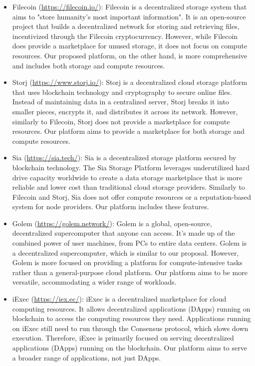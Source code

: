 \begin{itemize}
    \item Filecoin (\url{https://filecoin.io/}): Filecoin is a decentralized storage system that aims to "store humanity's most important information". It is an open-source project that builds a decentralized network for storing and retrieving files, incentivized through the Filecoin cryptocurrency. However, while Filecoin does provide a marketplace for unused storage, it does not focus on compute resources. Our proposed platform, on the other hand, is more comprehensive and includes both storage and compute resources.

    \item Storj (\url{https://www.storj.io/}): Storj is a decentralized cloud storage platform that uses blockchain technology and cryptography to secure online files. Instead of maintaining data in a centralized server, Storj breaks it into smaller pieces, encrypts it, and distributes it across its network. However, similarly to Filecoin, Storj does not provide a marketplace for compute resources. Our platform aims to provide a marketplace for both storage and compute resources.

    \item Sia (\url{https://sia.tech/}): Sia is a decentralized storage platform secured by blockchain technology. The Sia Storage Platform leverages underutilized hard drive capacity worldwide to create a data storage marketplace that is more reliable and lower cost than traditional cloud storage providers. Similarly to Filecoin and Storj, Sia does not offer compute resources or a reputation-based system for node providers. Our platform includes these features.

    \item Golem (\url{https://golem.network/}): Golem is a global, open-source, decentralized supercomputer that anyone can access. It's made up of the combined power of user machines, from PCs to entire data centers. Golem is a decentralized supercomputer, which is similar to our proposal. However, Golem is more focused on providing a platform for compute-intensive tasks rather than a general-purpose cloud platform. Our platform aims to be more versatile, accommodating a wider range of workloads.

    \item iExec (\url{https://iex.ec/}): iExec is a decentralized marketplace for cloud computing resources. It allows decentralized applications (DApps) running on blockchain to access the computing resources they need. Applications running on iExec still need to run through the Consensus protocol, which slows down execution. Therefore, iExec is primarily focused on serving decentralized applications (DApps) running on the blockchain. Our platform aims to serve a broader range of applications, not just DApps.


\end{itemize}
